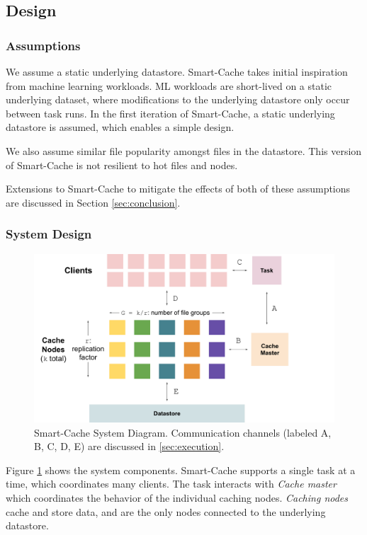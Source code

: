 \documentclass[sigconf]{acmart}
\begin{document}
\subsection{Design}
\label{sec:design}
\subsubsection{Assumptions}
\label{sec:assumptions}

We assume a static underlying datastore. Smart-Cache takes initial inspiration from machine learning workloads. ML workloads are short-lived on a static underlying dataset, where modifications to the underlying datastore only occur between task runs. In the first iteration of Smart-Cache, a static underlying datastore is assumed, which enables a simple design.

We also assume similar file popularity amongst files in the datastore. This version of Smart-Cache is not resilient to hot files and nodes.

Extensions to Smart-Cache to mitigate the effects of both of these assumptions are discussed in Section \ref{sec:conclusion}.

\subsubsection{System Design}
\label{sec:systemdesign}

\begin{figure}[h]
  \centering
  \includegraphics[width=\linewidth]{systemdiagram.pdf}
  \caption{\label{fig:systemdesign} Smart-Cache System Diagram. Communication channels (labeled A, B, C, D, E) are discussed in \ref{sec:execution}. }
\end{figure}

Figure \ref{fig:systemdesign} shows the system components. Smart-Cache supports a single task at a time, which coordinates many clients. The task interacts with \textit{Cache master} which coordinates the behavior of the individual caching nodes. \textit{Caching nodes} cache and store data, and are the only nodes connected to the underlying datastore. 
\end{document}
